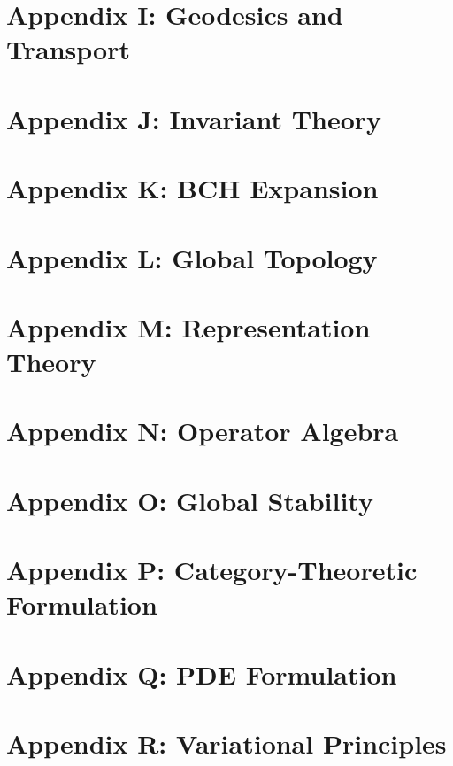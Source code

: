 \documentclass[11pt]{article}
\begin{document}
\section*{Appendix I: Geodesics and Transport}

\section*{Appendix J: Invariant Theory}

\section*{Appendix K: BCH Expansion}

\section*{Appendix L: Global Topology}

\section*{Appendix M: Representation Theory}

\section*{Appendix N: Operator Algebra}

\section*{Appendix O: Global Stability}

\section*{Appendix P: Category-Theoretic Formulation}

\section*{Appendix Q: PDE Formulation}

\section*{Appendix R: Variational Principles}
\end{document}
